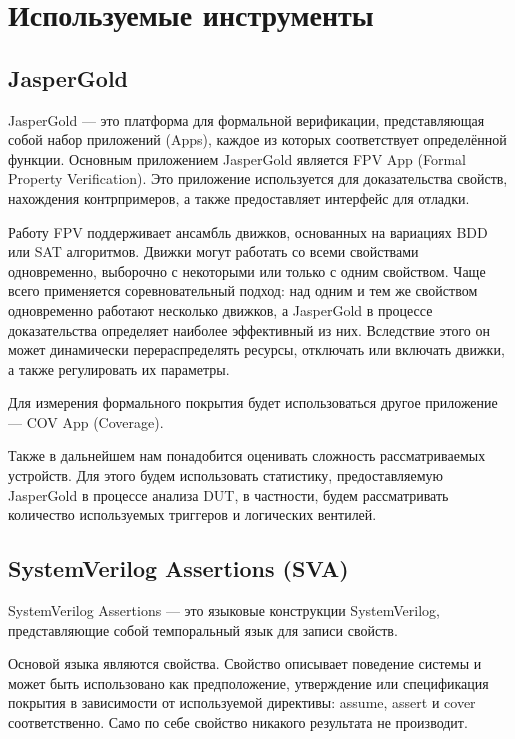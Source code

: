 \section{Используемые инструменты}

\subsection{JasperGold}

\tab JasperGold\cite{JASPER} --- это платформа для формальной верификации, представляющая собой набор приложений (Apps), каждое из которых соответствует определённой функции. Основным приложением JasperGold является FPV App (Formal Property Verification). Это приложение используется для доказательства свойств, нахождения контрпримеров, а также предоставляет интерфейс для отладки. 

Работу FPV поддерживает ансамбль движков, основанных на вариациях BDD или SAT алгоритмов. Движки могут работать со всеми свойствами одновременно, выборочно с некоторыми или только с одним свойством. Чаще всего применяется соревновательный подход: над одним и тем же свойством одновременно работают несколько движков, а JasperGold в процессе доказательства определяет наиболее эффективный из них. Вследствие этого он может динамически перераспределять ресурсы, отключать или включать движки, а также регулировать их параметры. 

Для измерения формального покрытия будет использоваться другое приложение --- COV App (Coverage). 

Также в дальнейшем нам понадобится оценивать сложность рассматриваемых устройств. Для этого будем использовать статистику, предоставляемую JasperGold в процессе анализа DUT, в частности, будем рассматривать количество используемых триггеров и логических вентилей. 

\subsection{SystemVerilog Assertions (SVA)}

\tab SystemVerilog Assertions --- это языковые конструкции SystemVerilog, представляющие собой темпоральный язык для записи свойств. 

Основой языка являются свойства. Свойство описывает поведение системы и может быть использовано как предположение, утверждение или спецификация покрытия в зависимости от используемой директивы: assume, assert и cover соответственно. Само по себе свойство никакого результата не производит. 

